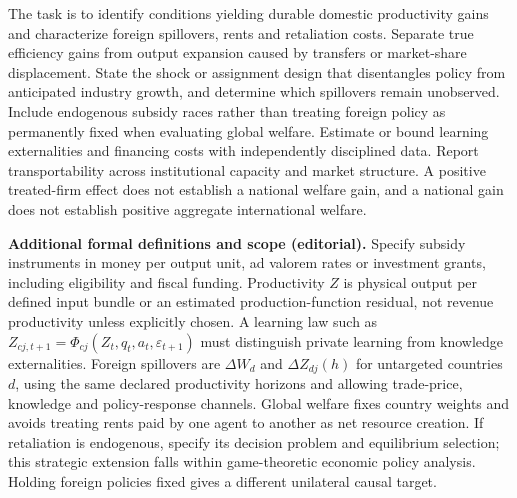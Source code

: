 \documentclass[11pt,a4paper]{article}
\begin{document}
The task is to identify conditions yielding durable domestic productivity gains and characterize foreign spillovers, rents and retaliation costs. Separate true efficiency gains from output expansion caused by transfers or market-share displacement. State the shock or assignment design that disentangles policy from anticipated industry growth, and determine which spillovers remain unobserved. Include endogenous subsidy races rather than treating foreign policy as permanently fixed when evaluating global welfare. Estimate or bound learning externalities and financing costs with independently disciplined data. Report transportability across institutional capacity and market structure. A positive treated-firm effect does not establish a national welfare gain, and a national gain does not establish positive aggregate international welfare.

\textbf{Additional formal definitions and scope (editorial).} Specify subsidy instruments in money per output unit, ad valorem rates or investment grants, including eligibility and fiscal funding. Productivity \(Z\) is physical output per defined input bundle or an estimated production-function residual, not revenue productivity unless explicitly chosen. A learning law such as \(Z_{cj,t+1}=\Phi_{cj}(Z_t,q_t,a_t,\varepsilon_{t+1})\) must distinguish private learning from knowledge externalities. Foreign spillovers are \(\Delta W_d\) and \(\Delta Z_{dj}(h)\) for untargeted countries \(d\), using the same declared productivity horizons and allowing trade-price, knowledge and policy-response channels. Global welfare fixes country weights and avoids treating rents paid by one agent to another as net resource creation. If retaliation is endogenous, specify its decision problem and equilibrium selection; this strategic extension falls within game-theoretic economic policy analysis. Holding foreign policies fixed gives a different unilateral causal target.
\end{document}
